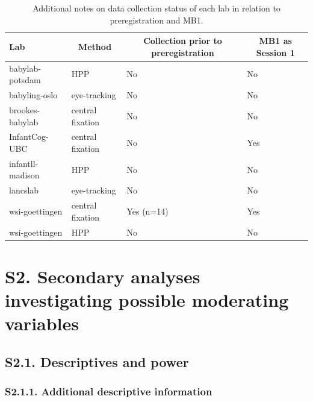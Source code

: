 \documentclass[
  man, donotrepeattitle,floatsintext]{apa6}
\begin{document}
\begin{table}[tbp]

\begin{center}
\begin{threeparttable}

\caption{\label{tab:unnamed-chunk-1}Additional notes on data collection status of each lab in relation to preregistration and MB1.}

\begin{tabular}{llll}
\toprule
Lab & \multicolumn{1}{c}{Method} & \multicolumn{1}{c}{Collection prior to preregistration} & \multicolumn{1}{c}{MB1 as Session 1}\\
\midrule
babylab-potsdam & HPP & No & No\\
babyling-oslo & eye-tracking & No & No\\
brookes-babylab & central fixation & No & No\\
InfantCog-UBC & central fixation & No & Yes\\
infantll-madison & HPP & No & No\\
lancslab & eye-tracking & No & No\\
wsi-goettingen & central fixation & Yes (n=14) & Yes\\
wsi-goettingen & HPP & No & No\\
\bottomrule
\end{tabular}

\end{threeparttable}
\end{center}

\end{table}

\newpage

\hypertarget{s2.-secondary-analyses-investigating-possible-moderating-variables}{%
\section{S2. Secondary analyses investigating possible moderating variables}\label{s2.-secondary-analyses-investigating-possible-moderating-variables}}

\hypertarget{s2.1.-descriptives-and-power}{%
\subsection{S2.1. Descriptives and power}\label{s2.1.-descriptives-and-power}}

\hypertarget{s2.1.1.-additional-descriptive-information}{%
\subsubsection{S2.1.1. Additional descriptive information}\label{s2.1.1.-additional-descriptive-information}}
\end{document}
